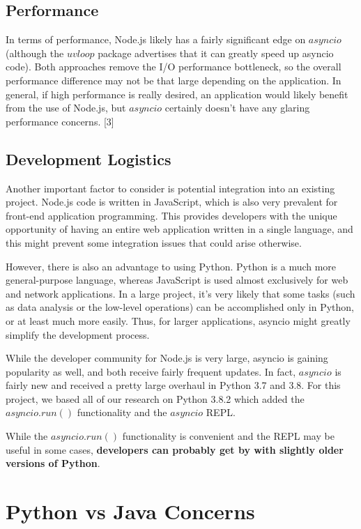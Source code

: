 \subsection{Performance}
In terms of performance, Node.js likely has a fairly significant edge on $asyncio$ (although the $uvloop$ package advertises
that it can greatly speed up asyncio code). Both approaches remove the I/O performance bottleneck, so the overall performance difference 
may not be that large depending on the application. In general, if high performance is really desired, an application would likely benefit 
from the use of Node.js, but $asyncio$ certainly doesn't have any glaring performance concerns. [3]

\subsection{Development Logistics}
Another important factor to consider is potential integration into an existing project. Node.js code is written in JavaScript, which is also very prevalent for 
front-end application programming. This provides developers with the unique opportunity of having an entire web application written in a single language, and this
might prevent some integration issues that could arise otherwise. 

However, there is also an advantage to using Python. Python is a much more general-purpose language, whereas JavaScript is used 
almost exclusively for web and network applications. In a large project, it's very likely that some tasks (such as data analysis or the low-level operations)
can be accomplished only in Python, or at least much more easily. Thus, for larger applications, asyncio might greatly simplify the development process.

While the developer community for Node.js is very large, asyncio is gaining popularity as well, and both receive fairly frequent updates. In fact, $asyncio$ is fairly
new and received a pretty large overhaul in Python 3.7 and 3.8. For this project, we based all of our research on Python 3.8.2 which added the $asyncio.run()$ functionality
and the $asyncio$ REPL.

While the $asyncio.run()$ functionality is convenient and the REPL may be useful in some cases, \textbf{developers can probably get by with slightly older versions of Python}.

\section{Python vs Java Concerns}
